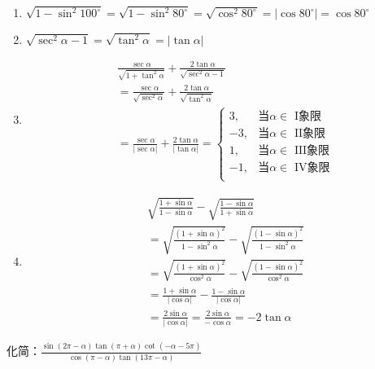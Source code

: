 \begin{solution}
\begin{enumerate}[(1)]
    \item $\sqrt{1-\sin^2 100^{\circ}}=\sqrt{1-\sin^2 80^{\circ}}=\sqrt{\cos^2 80^{\circ}}=|\cos80^{\circ}|=\cos80^{\circ}$
    \item $\sqrt{\sec^2\alpha -1}=\sqrt{\tan^2\alpha}=|\tan\alpha|$
    \item 
\begin{align}
   & \frac{\sec\alpha}{\sqrt{1+\tan^2\alpha}}+\frac{2\tan\alpha}{\sqrt{\sec^2\alpha-1}}\tag{可以看出：$\alpha$是象限中的角}\\
   &=\frac{\sec\alpha}{\sqrt{\sec^2\alpha}}+\frac{2\tan\alpha}{\sqrt{\tan^2\alpha}} \nonumber\\
    &=\frac{\sec\alpha}{|\sec\alpha|}+\frac{2\tan\alpha}{|\tan\alpha|}=\begin{cases}
        3,&  \text{当$\alpha\in $ I象限} \\
        -3,&  \text{当$\alpha\in $ II象限} \\
        1,&  \text{当$\alpha\in $ III象限} \\
        -1,&  \text{当$\alpha\in $ IV象限} \\
    \end{cases}\nonumber
\end{align}
    
\item 
\begin{align}
   & \sqrt{\frac{1+\sin\alpha}{1-\sin\alpha}}-\sqrt{\frac{1-\sin\alpha}{1+\sin\alpha}}\tag{$\alpha\in $ II 象限}\\
   &=\sqrt{\frac{(1+\sin\alpha)^2}{1-\sin^2\alpha}}-\sqrt{\frac{(1-\sin\alpha)^2}{1-\sin^2\alpha}}\tag{这一步至关重要！目的是把被开方式变成完全平方}\\
   &=\sqrt{\frac{(1+\sin\alpha)^2}{\cos^2\alpha}}-\sqrt{\frac{(1-\sin\alpha)^2}{\cos^2\alpha}}\nonumber\\
   &=\frac{1+\sin\alpha}{|\cos\alpha|}-\frac{1-\sin\alpha}{|\cos\alpha|}\tag{由于$\alpha\in$ II象限，所以$\sin\alpha\in(0,1)\Rightarrow 1\pm\sin\alpha>0$}\\
   &=\frac{2\sin\alpha}{|\cos\alpha|}=\frac{2\sin\alpha}{-\cos\alpha}=-2\tan\alpha \nonumber
\end{align}
\end{enumerate}
\end{solution}

\begin{example}
化简：$\frac{\sin(2\pi-\alpha)\tan(\pi+\alpha)\cot(-\alpha-5\pi)}{\cos(\pi-\alpha)\tan(13\pi-\alpha)}$
\end{example}


